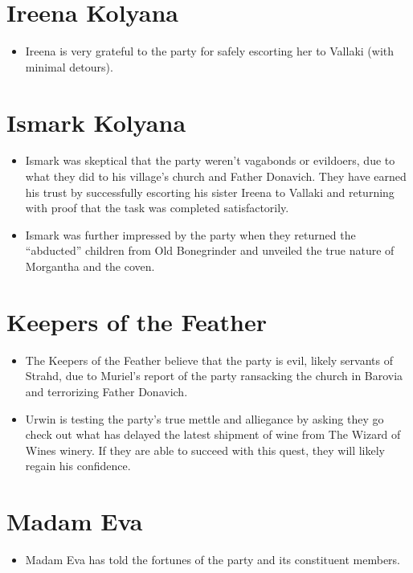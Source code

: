 \documentclass[a4paper,11pt]{article}
\begin{document}
\section{Ireena Kolyana}
\begin{itemize}
  \item Ireena is very grateful to the party for safely escorting her to Vallaki (with minimal detours).
\end{itemize}

\section{Ismark Kolyana}
\begin{itemize}
  \item Ismark was skeptical that the party weren't vagabonds or evildoers, due to what they did to his village's 
  church and Father Donavich. They have earned his trust by successfully escorting his sister Ireena to Vallaki 
  and returning with proof that the task was completed satisfactorily.
  \item Ismark was further impressed by the party when they returned the ``abducted'' children from Old 
  Bonegrinder and unveiled the true nature of Morgantha and the coven.
\end{itemize}

\section{Keepers of the Feather}
\begin{itemize}
  \item The Keepers of the Feather believe that the party is evil, likely servants of Strahd, due to Muriel's 
  report of the party ransacking the church in Barovia and terrorizing Father Donavich.
  \item Urwin is testing the party's true mettle and alliegance by asking they go check out what has delayed the
  latest shipment of wine from The Wizard of Wines winery. If they are able to succeed with this quest, they
  will likely regain his confidence.
\end{itemize}

\section{Madam Eva}
\begin{itemize}
  \item Madam Eva has told the fortunes of the party and its constituent members.
\end{itemize}
\end{document}
